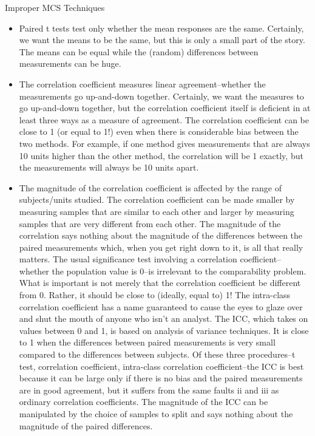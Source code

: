 Improper MCS Techniques

\begin{itemize}
\item Paired t tests test only whether the mean responses are the same. Certainly, we want the means to be the same, but this is only a small part of the story. The means can be equal while the (random) differences between measurements can be huge.
\item The correlation coefficient measures linear agreement--whether the measurements go up-and-down together. Certainly, we want the measures to go up-and-down together, but the correlation coefficient itself is deficient in at least three ways as a measure of agreement.
The correlation coefficient can be close to 1 (or equal to 1!) even when there is considerable bias between the two methods. For example, if one method gives measurements that are always 10 units higher than the other method, the correlation will be 1 exactly, but the measurements will always be 10 units apart.
\item The magnitude of the correlation coefficient is affected by the range of subjects/units studied. The correlation coefficient can be made smaller by measuring samples that are similar to each other and larger by measuring samples that are very different from each other. The magnitude of the correlation says nothing about the magnitude of the differences between the paired measurements which, when you get right down to it, is all that really matters.
The usual significance test involving a correlation coefficient-- whether the population value is 0--is irrelevant to the comparability problem. What is important is not merely that the correlation coefficient be different from 0. Rather, it should be close to (ideally, equal to) 1!
The intra-class correlation coefficient has a name guaranteed to cause the eyes to glaze over and shut the mouth of anyone who isn't an analyst. The ICC, which takes on values between 0 and 1, is based on analysis of variance techniques. It is close to 1 when the differences between paired measurements is very small compared to the differences between subjects. Of these three procedures--t test, correlation coefficient, intra-class correlation coefficient--the ICC is best because it can be large only if there is no bias and the paired measurements are in good agreement, but it suffers from the same faults ii and iii as ordinary correlation coefficients. The magnitude of the ICC can be manipulated by the choice of samples to split and says nothing about the magnitude of the paired differences.


\end{itemize}
